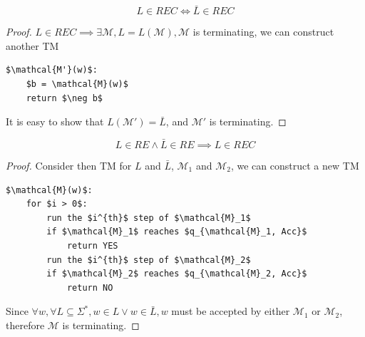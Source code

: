\documentclass{article}
\newtheorem{theorem}{Theorem}[section]
\let\oldtheorem\theorem
\let\endoldtheorem\endtheorem
\renewenvironment{theorem}
  {\begin{tcolorbox}[
      colback=yellow!6,
      colframe=yellow!60!black,
      boxrule=0.6pt,
      arc=2pt,
      left=6pt,right=6pt,top=4pt,bottom=4pt,
      parbox=false
    ]\oldtheorem}
  {\endoldtheorem\end{tcolorbox}}
\begin{document}
\begin{theorem}
    \[L \in REC \iff \bar{L} \in REC\]
\end{theorem}
\begin{proof}
    $L \in REC \implies \exists \mathcal{M}, L = L(\mathcal{M}), \mathcal{M}$ is terminating, we can construct another TM
    \begin{lstlisting}[mathescape=true]
$\mathcal{M'}(w)$:
    $b = \mathcal{M}(w)$
    return $\neg b$
    \end{lstlisting}
    It is easy to show that $L(\mathcal{M'}) = \bar{L}$, and $\mathcal{M'}$ is terminating.
\end{proof}
\begin{theorem}
    \[L \in RE \land \bar{L} \in RE \implies L \in REC\]
\end{theorem}
\begin{proof}
    Consider then TM for $L$ and $\bar{L}$, $\mathcal{M}_1$ and $\mathcal{M}_2$, we can construct a new TM
    \begin{lstlisting}[mathescape=true]
$\mathcal{M}(w)$:
    for $i > 0$:
        run the $i^{th}$ step of $\mathcal{M}_1$
        if $\mathcal{M}_1$ reaches $q_{\mathcal{M}_1, Acc}$
            return YES
        run the $i^{th}$ step of $\mathcal{M}_2$
        if $\mathcal{M}_2$ reaches $q_{\mathcal{M}_2, Acc}$
            return NO
    \end{lstlisting}
    Since $\forall w, \forall L\subseteq \Sigma^*, w \in L \lor w \in \bar{L}, w$ must be accepted by either $\mathcal{M}_1$ or $\mathcal{M}_2$, 
    therefore $\mathcal{M}$ is terminating.
\end{proof}
\end{document}
